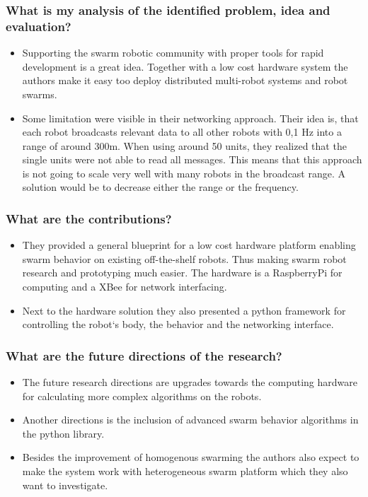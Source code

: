     \subsubsection*{What is my analysis of the identified problem, idea and evaluation?}
    \begin{itemize}
        \item Supporting the swarm robotic community with proper tools for rapid development is a great idea. Together with a low cost hardware system the authors make it easy too deploy distributed multi-robot systems and robot swarms.
        \item Some limitation were visible in their networking approach. Their idea is, that each robot broadcasts relevant data to all other robots with 0,1 Hz into a range of around 300m. When using around 50 units, they realized that the single units were not able to read all messages. This means that this approach is not going to scale very well with many robots in the broadcast range. A solution would be to decrease either the range or the frequency.
    \end{itemize}
    \subsubsection*{What are the contributions?}
    \begin{itemize}
        \item They provided a general blueprint for a low cost hardware platform enabling swarm behavior on existing off-the-shelf robots. Thus making swarm robot research and prototyping much easier. The hardware is a RaspberryPi for computing and a XBee for network interfacing.
        \item Next to the hardware solution they also presented a python framework for controlling the robot`s body, the behavior and the networking interface.
    \end{itemize}
    \subsubsection*{What are the future directions of the research?}
    \begin{itemize}
        \item The future research directions are upgrades towards the computing hardware for calculating more complex algorithms on the robots. 
        \item Another directions is the inclusion of advanced swarm behavior algorithms in the python library.
        \item Besides the improvement of homogenous swarming the authors also expect to make the system work with heterogeneous swarm platform which they also want to investigate.
    \end{itemize}

